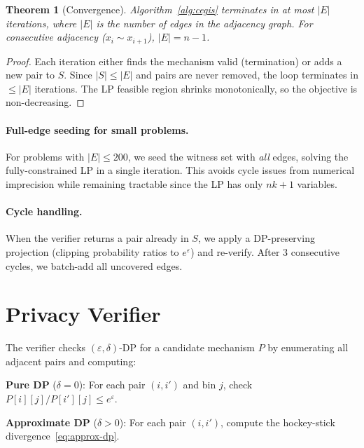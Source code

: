 \documentclass[11pt,a4paper]{article}
\newtheorem{theorem}{Theorem}
\begin{document}
\begin{theorem}[Convergence]
Algorithm~\ref{alg:cegis} terminates in at most $|E|$ iterations, where
$|E|$ is the number of edges in the adjacency graph.  For consecutive
adjacency ($x_i \sim x_{i+1}$), $|E| = n-1$.
\end{theorem}

\begin{proof}
Each iteration either finds the mechanism valid (termination) or adds a
new pair to $S$.  Since $|S| \le |E|$ and pairs are never removed, the loop
terminates in $\le |E|$ iterations.  The LP feasible region shrinks
monotonically, so the objective is non-decreasing.
\end{proof}

\paragraph{Full-edge seeding for small problems.}
For problems with $|E| \le 200$, we seed the witness set with \emph{all} edges,
solving the fully-constrained LP in a single iteration.  This avoids cycle
issues from numerical imprecision while remaining tractable since the LP has
only $nk + 1$ variables.

\paragraph{Cycle handling.}
When the verifier returns a pair already in $S$, we apply a DP-preserving
projection (clipping probability ratios to $e^\varepsilon$) and re-verify.
After 3 consecutive cycles, we batch-add all uncovered edges.

\section{Privacy Verifier}
\label{sec:verifier}

The verifier checks $(\varepsilon,\delta)$-DP for a candidate mechanism $P$
by enumerating all adjacent pairs and computing:

\textbf{Pure DP} ($\delta = 0$): For each pair $(i, i')$ and bin $j$,
check $P[i][j] / P[i'][j] \le e^\varepsilon$.

\textbf{Approximate DP} ($\delta > 0$): For each pair $(i, i')$,
compute the hockey-stick divergence~\eqref{eq:approx-dp}.
\end{document}

